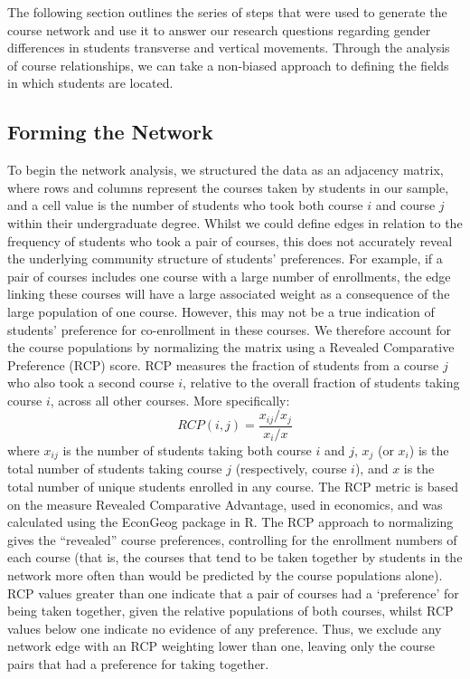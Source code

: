 The following section outlines the series of steps that were used to generate the course network and use it to answer our research questions regarding gender differences in students transverse and vertical movements. Through the analysis of course relationships, we can take a non-biased approach to defining the fields in which students are located. 

\subsection{Forming the Network}
To begin the network analysis, we structured the data as an adjacency matrix, where rows and columns represent the courses taken by students in our sample, and a cell value is the number of students who took both course $i$ and course $j$ within their undergraduate degree. Whilst we could define edges in relation to the frequency of students who took a pair of courses, this does not accurately reveal the underlying community structure of students' preferences. For example, if a pair of courses includes one course with a large number of enrollments, the edge linking these courses will have a large associated weight as a consequence of the large population of one course. However, this may not be a true indication of students' preference for co-enrollment in these courses. We therefore account for the course populations by normalizing the matrix using a Revealed Comparative Preference (RCP) score. RCP measures the fraction of students from a course $j$ who also took a second course $i$, relative to the overall fraction of students taking course $i$, across all other courses. More specifically: 
$$RCP(i,j) = \frac{x_{ij}/x_j}{x_i/x}$$
where $x_{ij}$ is the number of students taking both course $i$ and $j$, $x_j$ (or $x_i$) is the total number of students taking course $j$ (respectively, course $i$), and $x$ is the total number of unique students enrolled in any course.
The RCP metric is based on the measure Revealed Comparative Advantage, used in economics\cite{Balassa1965}, and was calculated using the EconGeog package in R.\cite{balland2017economic} The RCP approach to normalizing gives the ``revealed'' course preferences, controlling for the enrollment numbers of each course (that is, the courses that tend to be taken together by students in the network more often than would be predicted by the course populations alone). RCP values greater than one indicate that a pair of courses had a `preference' for being taken together, given the relative populations of both courses, whilst RCP values below one indicate no evidence of any preference. Thus, we exclude any network edge with an RCP weighting lower than one, leaving only the course pairs that had a preference for taking together. 

